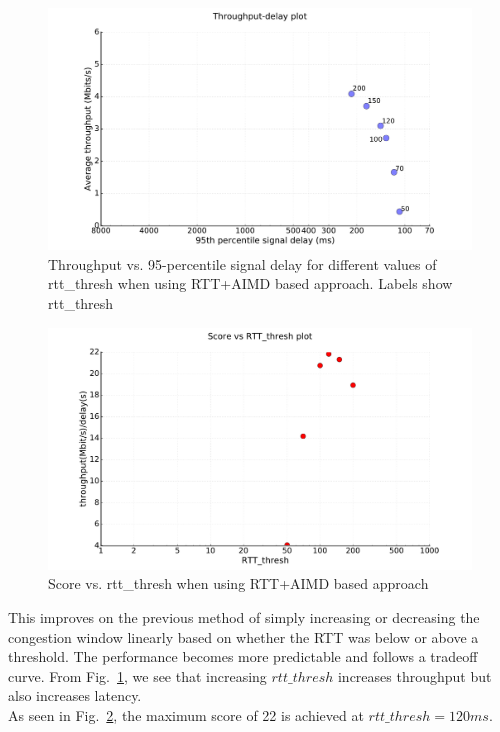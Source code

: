 \documentclass{article}
\begin{document}
\begin{figure}[h]
\includegraphics[width=\columnwidth]{"../C/aimd/aimdrtt"}
\caption{Throughput vs. 95-percentile signal delay for different
values of rtt\_thresh when using RTT+AIMD based approach. Labels
show rtt\_thresh}
\label{aimdrtt}
\end{figure}

\begin{figure}[h]
\includegraphics[width=\columnwidth]{"../C/aimd/aimdrtt-score"}
\caption{Score vs. rtt\_thresh when using RTT+AIMD based approach}
\label{aimdrtt-score}
\end{figure}

This improves on the previous method of simply increasing or
decreasing the congestion window linearly based on whether the RTT was
below or above a threshold. The performance becomes more predictable
and follows a tradeoff curve. From Fig.~\ref{aimdrtt}, we see that
increasing $rtt\_thresh$ increases throughput but also increases
latency.\\

As seen in Fig.~\ref{aimdrtt-score}, the maximum score of 22 is
achieved at $rtt\_thresh = 120ms$.
\end{document}
